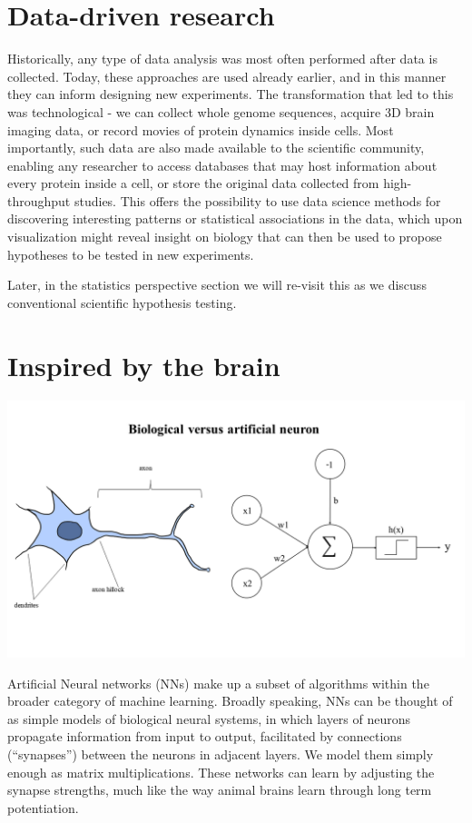 \documentclass[
]{book}
\begin{document}
\hypertarget{data-driven-research}{%
\section{Data-driven research}\label{data-driven-research}}

Historically, any type of data analysis was most often performed after data is collected. Today, these approaches are used already earlier, and in this manner they can inform designing new experiments. The transformation that led to this was technological - we can collect whole genome sequences, acquire 3D brain imaging data, or record movies of protein dynamics inside cells. Most importantly, such data are also made available to the scientific community, enabling any researcher to access databases that may host information about every protein inside a cell, or store the original data collected from high-throughput studies. This offers the possibility to use data science methods for discovering interesting patterns or statistical associations in the data, which upon visualization might reveal insight on biology that can then be used to propose hypotheses to be tested in new experiments.

Later, in the statistics perspective section we will re-visit this as we discuss conventional scientific hypothesis testing.

\hypertarget{inspired-by-the-brain}{%
\section{Inspired by the brain}\label{inspired-by-the-brain}}

\includegraphics{assets/neuron_artificial_biological.png}

Artificial Neural networks (NNs) make up a subset of algorithms within the broader category of machine learning. Broadly speaking, NNs can be thought of as simple models of biological neural systems, in which layers of neurons propagate information from input to output, facilitated by connections (``synapses'') between the neurons in adjacent layers. We model them simply enough as matrix multiplications. These networks can learn by adjusting the synapse strengths, much like the way animal brains learn through long term potentiation.
\end{document}
